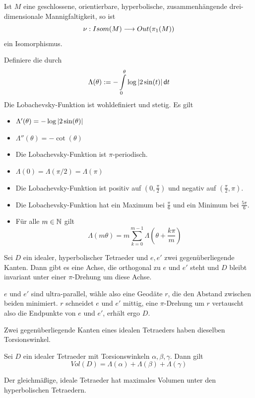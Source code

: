 \documentclass{book}
\renewcommand{\d}{\textsf{d}}
\begin{document}
\Kor{}
Ist $M$ eine geschlossene, orientierbare, hyperbolische, zusammenhängende drei-dimensionale Mannigfaltigkeit, so ist
\[ \nu : Isom(M) \overset{}{\longrightarrow} Out(\pi_1(M)) \]
ein Isomorphismus.

\Def{}
Definiere die  durch
\[ \Lambda(\theta) :=- \int\limits_{0}^{\theta} \log \bet{2\sin (t)} \d t \]
\Lem{}
Die Lobachevsky-Funktion ist wohldefiniert und stetig. Es gilt
\begin{itemize}
	\item $\Lambda'(\theta) = -\log \left|2\sin (\theta)\right| $
	\item $\Lambda''(\theta) = -\cot(\theta) $
\end{itemize}

\Lem{}
\begin{itemize}
	\item Die Lobachevsky-Funktion ist $\pi$-periodisch.
	\item $\Lambda(0) = \Lambda(\pi / 2) = \Lambda(\pi)$
	\item Die Lobachevsky-Funktion ist positiv auf $(0,\frac{\pi}{2})$ und negativ auf $(\frac{\pi}{2}, \pi)$.
	\item Die Lobachevsky-Funktion hat ein Maximum bei $\frac{\pi}{6}$ und ein Minimum bei $\frac{5\pi}{6}$.
	\item Für alle $m\in \mathbb{N}$ gilt
	\[ \Lambda(m\theta) = m\sum\limits_{k = 0}^{m-1} \Lambda(\theta + \frac{k\pi}{m}) \]
\end{itemize}

\Lem{}
Sei $D$ ein idealer, hyperbolischer Tetraeder und $e,e'$ zwei gegenüberliegende Kanten. Dann gibt es eine Achse, die orthogonal zu $e$ und $e'$ steht und $D$ bleibt invariant unter einer $\pi$-Drehung um diese Achse.
\begin{Beweis}{}
	$e$ und $e'$ sind ultra-parallel, wähle also eine Geodäte $r$, die den Abstand zwischen beiden minimiert. $r$ schneidet $e$ und $e'$ mittig, eine $\pi$-Drehung um $r$ vertauscht also die Endpunkte von $e$ und $e'$, erhält ergo $D$.
\end{Beweis}

\Kor{}
Zwei gegenüberliegende Kanten eines idealen Tetraeders haben dieselben Torsionswinkel.

\Satz{}
Sei $D$ ein idealer Tetraeder mit Torsionswinkeln $\alpha, \beta, \gamma$. Dann gilt
\[ Vol(D) = \Lambda(\alpha) + \Lambda(\beta) + \Lambda(\gamma) \]

\Kor{}
Der gleichmäßige, ideale Tetraeder hat maximales Volumen unter den hyperbolischen Tetraedern.
\end{document}
